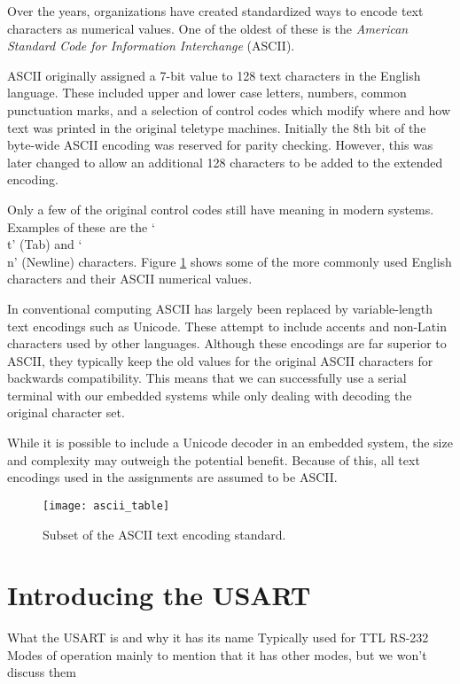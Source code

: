 \documentclass[11pt,fleqn]{book} %
\begin{document}
Over the years, organizations have created standardized ways to encode text characters as numerical values. One of the oldest of these is the \textit{American Standard Code for Information Interchange} (ASCII). 

ASCII originally assigned a 7-bit value to 128 text characters in the English language. These included upper and lower case letters, numbers, common punctuation marks, and a selection of control codes which modify where and how text was printed in the original teletype machines. Initially the 8th bit of the byte-wide ASCII encoding was reserved for parity checking. However, this was later changed to allow an additional 128 characters to be added to the extended encoding. 

Only a few of the original control codes still have meaning in modern systems. Examples of these are the `\\t' (Tab) and `\\n' (Newline) characters. Figure \ref{ascii_table} shows some of the more commonly used English characters and their ASCII numerical values.  

In conventional computing ASCII has largely been replaced by variable-length text encodings such as Unicode. These attempt to include accents and non-Latin characters used by other languages. Although these encodings are far superior to ASCII, they typically keep the old values for the original ASCII characters for backwards compatibility. This means that we can successfully use a serial terminal with our embedded systems while only dealing with decoding the original character set.

While it is possible to include a Unicode decoder in an embedded system, the size and complexity may outweigh the potential benefit. Because of this, all text encodings used in the assignments are assumed to be ASCII.

\begin{figure}[]
    \centering\texttt{[image: ascii\_table]}
    \caption{Subset of the ASCII text encoding standard.}
    \label{ascii_table}
\end{figure}


\section{Introducing the USART}
What the USART is and why it has its name
Typically used for TTL RS-232
Modes of operation
mainly to mention that it has other modes, but we won't discuss them 
\end{document}

